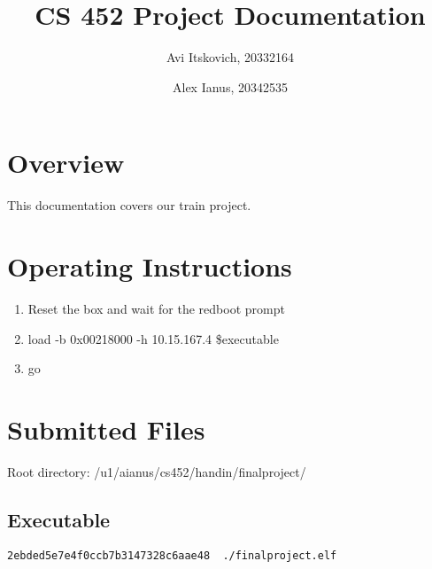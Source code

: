 \documentclass{article}
\title{CS 452 Project Documentation}
\author{
  Avi Itskovich, 20332164
  \and
  Alex Ianus, 20342535
}
\begin{document}
\maketitle

\section{Overview}

This documentation covers our train project.

\section{Operating Instructions}
\begin{enumerate}
  \item Reset the box and wait for the redboot prompt
  \item load -b 0x00218000 -h 10.15.167.4 \$executable
  \item go
\end{enumerate}

\section{Submitted Files}
Root directory: /u1/aianus/cs452/handin/finalproject/

\subsection{Executable}
\begin{verbatim}
2ebded5e7e4f0ccb7b3147328c6aae48  ./finalproject.elf
\end{verbatim}
\end{document}
